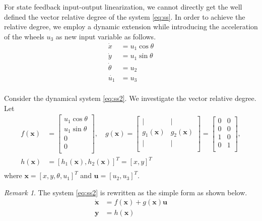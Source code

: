 \documentclass[11pt, a4paper, oneside, openany, reqno]{book}
\theoremstyle{definition}
\theoremstyle{remark}
\newtheorem{remark}[theorem]{Remark}
\numberwithin{equation}{chapter} %
\newcommand{\x}{\textbf{x}}
\newcommand{\y}{\textbf{y}}
\newcommand{\U}{\textbf{u}}
\begin{document}
For state feedback input-output linearization, 
we cannot directly get the well defined the vector relative degree of the system \eqref{eq:ss}.
In order to achieve the relative degree, we employ a dynamic extension \cite{isidori} 
while introducing the acceleration of the wheels $ u_3 $ as new input variable 
as follows.
\begin{equation}\begin{split}\label{eq:ss2}
	\dot{x}&=u_1 \cos \theta\\
	\dot{y}&=u_1 \sin \theta\\
	\dot{\theta}&=u_2\\	
	\dot{u_1}&=u_3\\	
\end{split}\end{equation} 

Consider the dynamical system \eqref{eq:ss2}.
We investigate the vector relative degree.
Let
\begin{equation}\begin{split}\label{deffgh}
	f(\x) &= \left[ \begin{array}{c } u_1 \cos \theta \\
		u_1 \sin \theta \\
		0 \\ 0 \\	\end{array} \right], \quad 
	g(\x) = \left[ \begin{array}{cc } \vert & \vert \\
		g_1(\x) & g_2(\x) \\
		\vert & \vert \\ \end{array} \right]
		= \left[ \begin{array}{cc } 0 & 0 \\		0 & 0 \\		1 & 0 \\
		0 & 1 \\	\end{array} \right],\\
	h(\x) &= \left[ h_1(\x),h_2(\x) \right]^T = \left[ x,y \right]^T \\
\end{split}\end{equation}
where $ \x = \left[ x,y, \theta, u_1 \right]^T $ and $ \U = \left[ u_2,u_3 \right]^T $.

\begin{remark}
	The system \eqref{eq:ss2} is rewritten as the simple form as shown below.
	\begin{equation}\begin{split}
		\dot{\x} &= f(\x) + g(\x) \U \\
		\y &= h(\x) \\
	\end{split}\end{equation}
\end{remark}
\end{document}
